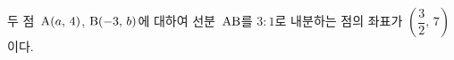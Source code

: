 두 점~$\mathrm{A}(a,\,4)$, $\mathrm{B}(-3,\,b)$에 대하여 선분~$\mathrm{AB}$를 $3:1$로 내분하는 점의 좌표가 $\left(\dfrac{3}{2},\,7\right)$이다.

